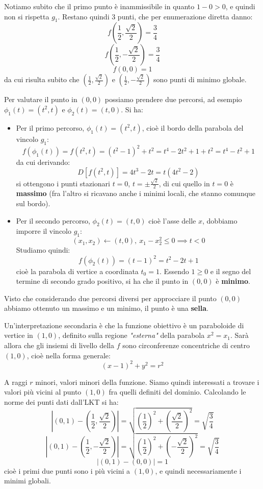\documentclass[a4paper,11pt]{article}
\begin{document}
\begin{enumerate}
Notiamo subito che il primo punto è inammissibile in quanto $1 - 0 > 0$, e quindi non si rispetta $g_1$.
Restano quindi 3 punti, che per enumerazione diretta danno:
$$
f\left(\frac{1}{2}, \frac{\sqrt{2}}{2}\right) = \frac{3}{4}
$$
$$
f\left(\frac{1}{2}, -\frac{\sqrt{2}}{2}\right) = \frac{3}{4}
$$
$$
f\left(0, 0\right) = 1
$$
da cui risulta subito che $\left(\frac{1}{2}, \frac{\sqrt{2}}{2}\right)$ e $\left(\frac{1}{2}, -\frac{\sqrt{2}}{2}\right)$ sono punti di minimo globale.

Per valutare il punto in $(0,0)$ possiamo prendere due percorsi, ad esempio $\phi_1(t) = (t^2, t)$ e $\phi_2(t) = (t, 0)$.
Si ha:
\begin{itemize}
	\item Per il primo percorso, $\phi_1(t) = (t^2, t)$, cioè il bordo della parabola del vincolo $g_1$: 
		$$
		f(\phi_1(t)) = f(t^2, t) = (t^2 -1)^2 + t^2 = t^4 - 2t^2 + 1 + t^2 = t^4 -t^2 + 1
		$$
		da cui derivando:
		$$
		D \left[ f(t^2, t) \right] = 4t^3 - 2t = t(4t^2 -2)
		$$
		si ottengono i punti stazionari $t = 0$, $t = \pm \frac{\sqrt{2}}{2}$, di cui quello in $t = 0$ è \textbf{massimo} (fra l'altro si ricavano anche i minimi locali, che stanno comunque sul bordo).
	\item Per il secondo percorso, $\phi_2(t) = (t, 0)$ cioè l'asse delle $x$, dobbiamo imporre il vincolo $g_1$:
		$$
		(x_1, x_2) \leftarrow (t, 0), \ x_1 - x_2^2 \leq 0 \implies t < 0
		$$
		Studiamo quindi:
		$$
		f(\phi_2(t)) = (t - 1)^2 = t^2 - 2t + 1
		$$
		cioè la parabola di vertice a coordinata $t_0 = 1$.
		Essendo $1 \geq 0$ e il segno del termine di secondo grado positivo, si ha che il punto in $(0,0)$ è \textbf{minimo}.
\end{itemize}

Visto che considerando due percorsi diversi per approcciare il punto $(0,0)$ abbiamo ottenuto un massimo e un minimo, il punto è una \textbf{sella}.

Un'interpretazione secondaria è che la funzione obiettivo è un paraboloide di vertice in $(1, 0)$, definito sulla regione \textit{"esterna"} della parabola $x^2 = x_1$.
Sarà allora che gli insiemi di livello della $f$ sono circonferenze concentriche di centro $(1,0)$, cioè nella forma generale:
$$
(x - 1)^2 + y^2 = r^2
$$

A raggi $r$ minori, valori minori della funzione.
Siamo quindi interessati a trovare i valori più vicini al punto $(1, 0)$ fra quelli definiti del dominio.
Calcolando le norme dei punti dati dall'LKT si ha:
$$
\left|(0,1) - \left( \frac{1}{2}, \frac{\sqrt{2}}{2}\right) \right| = \sqrt{\left(\frac{1}{2}\right)^2 + \left(\frac{\sqrt{2}}{2}\right)^2} = \sqrt{\frac{3}{4}}
$$
$$
\left|(0,1) - \left( \frac{1}{2}, -\frac{\sqrt{2}}{2}\right) \right| = \sqrt{\left(\frac{1}{2}\right)^2 + \left(-\frac{\sqrt{2}}{2}\right)^2} = \sqrt{\frac{3}{4}}
$$
$$
|(0,1) - (0,0)| = 1
$$
cioè i primi due punti sono i più vicini a $(1,0)$, e quindi necessariamente i minimi globali.


\end{enumerate}
\end{document}
